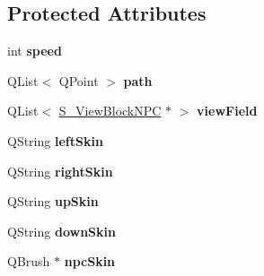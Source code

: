 \subsection*{Protected Attributes}
\begin{DoxyCompactItemize}
\item 
\hypertarget{class_c___enemy_a9e77e1a4a2e282f95a9fde2cd1c3eff4}{}int {\bfseries speed}\label{class_c___enemy_a9e77e1a4a2e282f95a9fde2cd1c3eff4}

\item 
\hypertarget{class_c___enemy_a5cb585e57719eaca668ec27e1d8adf13}{}Q\+List$<$ Q\+Point $>$ {\bfseries path}\label{class_c___enemy_a5cb585e57719eaca668ec27e1d8adf13}

\item 
\hypertarget{class_c___enemy_adb18de5122d5a71c24baec391b9da344}{}Q\+List$<$ \hyperlink{class_s___view_block_n_p_c}{S\+\_\+\+View\+Block\+N\+P\+C} $\ast$ $>$ {\bfseries view\+Field}\label{class_c___enemy_adb18de5122d5a71c24baec391b9da344}

\item 
\hypertarget{class_c___enemy_aafa32cebaae03850124a4c7d4b72b0cc}{}Q\+String {\bfseries left\+Skin}\label{class_c___enemy_aafa32cebaae03850124a4c7d4b72b0cc}

\item 
\hypertarget{class_c___enemy_af13fa44cc785b3745bffdaf4ce428164}{}Q\+String {\bfseries right\+Skin}\label{class_c___enemy_af13fa44cc785b3745bffdaf4ce428164}

\item 
\hypertarget{class_c___enemy_adf93c5ab2984c5d4e6d444c79a941007}{}Q\+String {\bfseries up\+Skin}\label{class_c___enemy_adf93c5ab2984c5d4e6d444c79a941007}

\item 
\hypertarget{class_c___enemy_a7d46633af0019c72b5e2957d95df9d2f}{}Q\+String {\bfseries down\+Skin}\label{class_c___enemy_a7d46633af0019c72b5e2957d95df9d2f}

\item 
\hypertarget{class_c___enemy_ac139cb5e0ada9c22373ce93ce876bd8e}{}Q\+Brush $\ast$ {\bfseries npc\+Skin}\label{class_c___enemy_ac139cb5e0ada9c22373ce93ce876bd8e}

\end{DoxyCompactItemize}
